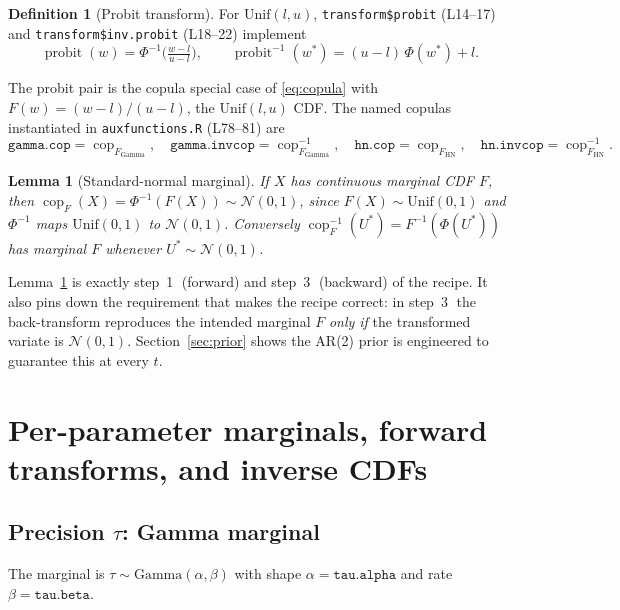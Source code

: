 \documentclass[11pt]{article}
\newtheorem{lemma}{Lemma}
\theoremstyle{definition}
\newtheorem{definition}{Definition}
\newcommand{\Norm}{\mathcal{N}}
\newcommand{\Unif}{\mathrm{Unif}}
\newcommand{\Gam}{\mathrm{Gamma}}
\newcommand{\HN}{\mathrm{HN}}
\newcommand{\Phinv}{\Phi^{-1}}
\newcommand{\code}[1]{\texttt{#1}}
\begin{document}
\begin{definition}[Probit transform]
For $\Unif(l,u)$, \code{transform\$probit} (L14--17) and \code{transform\$inv.probit}
(L18--22) implement
\begin{equation}
\operatorname{probit}(w) = \Phinv\!\Big(\tfrac{w-l}{u-l}\Big),
\qquad
\operatorname{probit}^{-1}(w^\ast) = (u-l)\,\Phi(w^\ast) + l.
\label{eq:probit}
\end{equation}
\end{definition}

The probit pair is the copula special case of \eqref{eq:copula} with
$F(w)=(w-l)/(u-l)$, the $\Unif(l,u)$ CDF. The named copulas instantiated in
\code{auxfunctions.R} (L78--81) are
\[
\code{gamma.cop} = \operatorname{cop}_{F_\Gam},\quad
\code{gamma.invcop} = \operatorname{cop}_{F_\Gam}^{-1},\quad
\code{hn.cop} = \operatorname{cop}_{F_\HN},\quad
\code{hn.invcop} = \operatorname{cop}_{F_\HN}^{-1}.
\]

\begin{lemma}[Standard-normal marginal]
\label{lem:sn}
If $X$ has continuous marginal CDF $F$, then $\operatorname{cop}_F(X)=\Phinv(F(X))\sim\Norm(0,1)$,
since $F(X)\sim\Unif(0,1)$ and $\Phinv$ maps $\Unif(0,1)$ to $\Norm(0,1)$.
Conversely $\operatorname{cop}_F^{-1}(U^\ast)=F^{-1}(\Phi(U^\ast))$ has marginal $F$
whenever $U^\ast\sim\Norm(0,1)$.
\end{lemma}

Lemma~\ref{lem:sn} is exactly step~\textcircled{1} (forward) and step~\textcircled{3}
(backward) of the recipe. It also pins down the requirement that makes the recipe
correct: in step~\textcircled{3} the back-transform reproduces the intended marginal
$F$ \emph{only if} the transformed variate is $\Norm(0,1)$. Section~\ref{sec:prior}
shows the AR(2) prior is engineered to guarantee this at every $t$.

\section{Per-parameter marginals, forward transforms, and inverse CDFs}
\label{sec:perparam}

\subsection{Precision $\tau$: Gamma marginal}
The marginal is $\tau\sim\Gam(\alpha,\beta)$ with shape $\alpha=\code{tau.alpha}$
and rate $\beta=\code{tau.beta}$.
\end{document}
